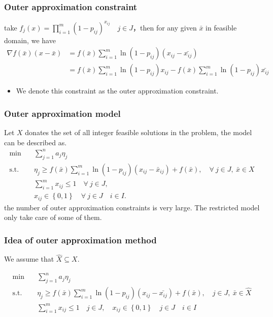 \documentclass[CJK,10pt]{beamer}
\begin{document}
\begin{frame}
    \frametitle{Outer approximation constraint}
    take $f_j(x) =  \prod_{i=1}^m (1 -  p_{ij})^{x_{ij}}\quad j \in J$，then for any given  $\bar{x}$ in feasible domain, we have 
    \begin{align*}
        \nabla f(\bar{x})(x - \bar{x}) & = f(\bar{x})\sum_{i = 1}^m \ln(1-p_{ij})(x_{ij} - \bar{x_{ij}})\\
        &= f(\bar{x})\sum_{i = 1}^m \ln(1-p_{ij})x_{ij} - f(\bar{x})\sum_{i = 1}^m \ln(1-p_{ij})\bar{x_{ij}}
    \end{align*}
    \begin{itemize}
        \item We denote this constraint as the outer approximation constraint.
    \end{itemize}
    

    
\end{frame}

\begin{frame}
    \frametitle{Outer approximation model}
    Let $X$ donates the set of all integer feasible solutions in the problem, the model can be described as.
    {\scriptsize
    \begin{align*} \tag{OA}
        \min\quad & \sum_{j=1}^n a_j \eta_j \\ 
        \mathrm{s. t.}\quad & \eta_j \geq f(\bar{x})\sum_{i = 1}^m \ln(1-p_{ij})(x_{ij} - \bar{x}_{ij}) + f(\bar{x}), \quad \forall ~ j \in J,\ \bar{x} \in X \\ 
        &\sum_{i=1}^m x_{ij} \leq 1\quad \forall ~ j \in J,\\
        & x_{ij} \in \left\{ 0,1 \right\} \quad \forall ~ j\in J\quad i \in I.
    \end{align*}
    }
    the number of outer approximation constraints is very large. The restricted model only take care of some of them.
   
\end{frame}

\begin{frame}
    \frametitle{Idea of outer approximation method}
    We assume that $\hat{X} \subseteq X$.
    {
    \scriptsize
    
    \begin{align*}
        \min\quad & \sum_{j=1}^n a_j \eta_j \\ 
        \mathrm{s. t.}\quad & \eta_j \geq f(\bar{x})\sum_{i = 1}^m \ln(1-p_{ij})(x_{ij} - \bar{x_{ij}}) + f(\bar{x}), \quad j \in J,\ \bar{x} \in \hat{X} \\ 
        &\sum_{i=1}^m x_{ij} \leq 1\quad j \in J,\quad x_{ij} \in \left\{ 0,1 \right\} \quad j\in J\quad i \in I
    \end{align*}
    }
\end{frame}
\end{document}
